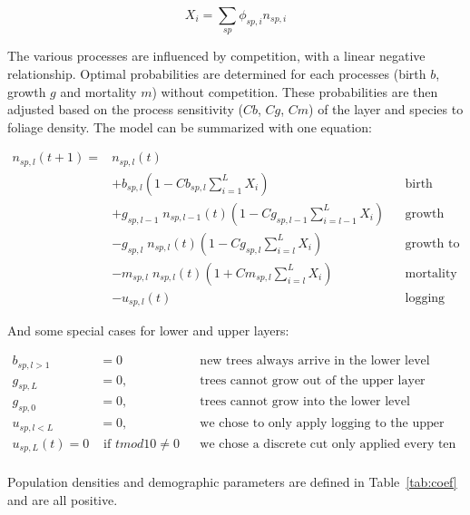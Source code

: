 \documentclass{article}
\begin{document}
\begin{equation}
    X_{i} = \sum_{sp} \phi_{sp,i} n_{sp,i}
\end{equation}

The various processes are influenced by competition, with a linear negative relationship. Optimal probabilities are determined for each processes (birth $b$, growth $g$ and mortality $m$) without competition. These probabilities are then adjusted based on the process sensitivity ($Cb$, $Cg$, $Cm$) of the layer and species to foliage density. The model can be summarized with one equation:

\begin{equation}
\begin{aligned}
    n_{sp,l}(t+1) = {} & n_{sp,l}(t) \\
    & + b_{sp,l} (1 - Cb_{sp,l} \sum_{i = 1}^{L} X_{i}) &&\text{birth} \\
    & + g_{sp,l - 1} \; n_{sp,l-1}(t) (1 - Cg_{sp,l-1} \sum_{i = l-1}^{L} X_{i}) &&\text{growth from lower level}\\
    & - g_{sp,l} \; n_{sp,l}(t) (1 - Cg_{sp,l} \sum_{i = l}^{L} X_{i}) &&\text{growth to upper level}\\
    & - m_{sp,l} \; n_{sp,l}(t) (1 + Cm_{sp,l} \sum_{i = l}^{L} X_{i}) &&\text{mortality} \\
    & - u_{sp, l}(t) &&\text{logging}
\end{aligned}
\label{eq:model_general}
\end{equation}

And some special cases for lower and upper layers:

\begin{equation}
\begin{aligned}
    b_{sp,l>1} & = 0 && \text{new trees always arrive in the lower level} \\
    g_{sp,L} & = 0, && \text{trees cannot grow out of the upper layer} \\
    g_{sp,0} & = 0, && \text{trees cannot grow into the lower level} \\
    u_{sp,l<L} & = 0, && \text{we chose to only apply logging to the upper level} \\
    u_{sp,L}(t) = 0 & \text{ if } tmod10 \neq 0 && \text{we chose a discrete cut only applied every ten years} \\ 
\end{aligned}
\label{eq:model_conditions}
\end{equation}

Population densities and demographic parameters are defined in Table~\ref{tab:coef} and are all positive.
\end{document}
